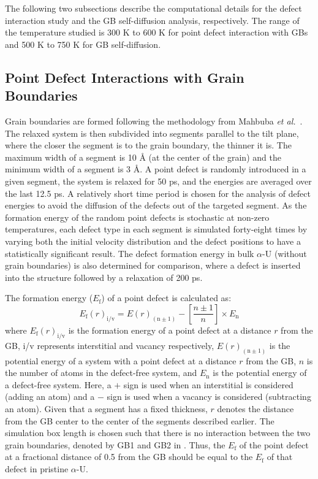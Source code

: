 \documentclass[review]{elsarticle}
\begin{document}
The following two subsections describe the computational details for the defect interaction study and the GB self-diffusion analysis, respectively. The range of the temperature studied is 300 K to 600 K for point defect interaction with GBs and 500 K to 750 K for GB self-diffusion. 

\subsection{Point Defect Interactions with Grain Boundaries}\label{sec:comp1}
\par Grain boundaries are formed following the methodology from Mahbuba \textit{et al.}~\cite{MAHBUBA2021153072}. The relaxed system is then subdivided into segments parallel to the tilt plane, where the closer the segment is to the grain boundary, the thinner it is. The maximum width of a segment is 10 {\AA} (at the center of the grain) and the minimum width of a segment is 3 {\AA}. A point defect is randomly introduced in a given segment, the system is relaxed for 50 ps, and the energies are averaged over the last 12.5 ps. A relatively short time period is chosen for the analysis of defect energies to avoid the diffusion of the defects out of the targeted segment. As the formation energy of the random point defects is stochastic at non-zero temperatures, each defect type in each segment is simulated forty-eight times by varying both the initial velocity distribution and the defect positions to have a statistically significant result. The defect formation energy in bulk $\alpha$-U (without grain boundaries) is also determined for comparison, where a defect is inserted into the structure followed by a relaxation of 200 ps.

The formation energy ($E_{\mathrm{f}}$) of a point defect is calculated as:
%
\begin{equation}
\label{eq:eform1}
E_{\mathrm{f}}(r)_{\mathrm{i/v}} = E(r)_{\mathrm{(n\pm 1)}}-\left[\frac{n \pm 1}{n}\right]\times E_{\mathrm{n}}
\end{equation}
%
where $E_{\mathrm{f}}(r)_{\mathrm{i/v}}$ is the formation energy of a point defect at a distance $r$ from the GB, i/v represents interstitial and vacancy respectively, $E(r)_{\mathrm{(n\pm1)}}$ is the potential energy of a system with a point defect at a distance $r$ from the GB, $n$ is the number of atoms in the defect-free system, and $E_{\mathrm{n}}$ is the potential energy of a defect-free system. Here, a $+$ sign is used when an interstitial is considered (adding an atom) and a $-$ sign is used when a vacancy is considered (subtracting an atom). Given that a segment has a fixed thickness, $r$ denotes the distance from the GB center to the center of the segments described earlier. The simulation box length is chosen such that there is no interaction between the two grain boundaries, denoted by GB1 and GB2 in . Thus, the $E_{\mathrm{f}}$ of the point defect at a fractional distance of 0.5 from the GB should be equal to the $E_{\mathrm{f}}$ of that defect in pristine $\alpha$-U. 
\end{document}
